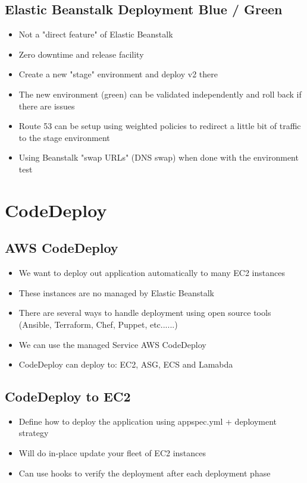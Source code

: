 \subsection{Elastic Beanstalk Deployment Blue / Green}
\begin{itemize}
    \item Not a "direct feature" of Elastic Beanstalk
    \item Zero downtime and release facility
    \item Create a new "stage" environment and deploy v2 there
    \item The new environment (green) can be validated independently and roll back if there are issues
    \item Route 53 can be setup using weighted policies to redirect a little bit of traffic to the stage environment
    \item Using Beanstalk "swap URLs" (DNS swap) when done with the environment test
\end{itemize}


\section{CodeDeploy}

\subsection{AWS CodeDeploy}
\begin{itemize}
    \item We want to deploy out application automatically to many EC2 instances
    \item These instances are no managed by Elastic Beanstalk
    \item There are several ways to handle deployment using open source tools (Ansible, Terraform, Chef, Puppet, etc......)
    \item We can use the managed Service AWS CodeDeploy
    \item CodeDeploy can deploy to: EC2, ASG, ECS and Lamabda
\end{itemize}

\subsection{CodeDeploy to EC2}
\begin{itemize}
    \item Define how to deploy the application using appspec.yml + deployment strategy
    \item Will do in-place update your fleet of EC2 instances
    \item Can use hooks to verify the deployment after each deployment phase
\end{itemize}

